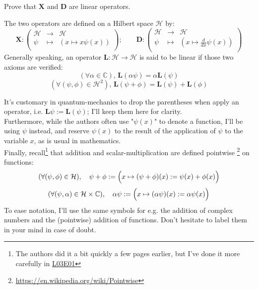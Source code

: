 \documentclass[solutions.tex]{subfiles}
\begin{document}
\maketitle
\begin{exercise} Prove that $\bm{X}$ and $\bm{D}$ are linear
operators.
\end{exercise}
The two operators are defined on a Hilbert space $\mathcal{H}$ by:
\[
	\bm{X} : \begin{pmatrix}
		\mathcal{H} &\rightarrow& \mathcal{H} \\
		\psi & \mapsto &(x \mapsto x\psi(x)) \\
	\end{pmatrix};\qquad
	\bm{D} : \begin{pmatrix}
		\mathcal{H} &\rightarrow& \mathcal{H} \\
		\psi & \mapsto & (x \mapsto \frac{d}{dx}\psi(x)) \\
	\end{pmatrix}
\]
Generally speaking, an operator $\bm{L} : \mathcal{H} \rightarrow \mathcal{H}$
is said to be linear if those two axioms are verified:
\[
	(\forall \alpha\in\mathbb{C}),\, \bm{L}(\alpha\psi) = \alpha\bm{L}(\psi)
\]
\[
	(\forall (\psi,\phi)\in\mathcal{H}^2),\, \bm{L}(\psi+\phi) = \bm{L}(\psi)+\bm{L}(\phi)
\]

\begin{remark} It's customary in quantum-mechanics to drop the parentheses when
apply an operator, i.e. $\bm{L}\psi := \bm{L}(\psi)$; I'll keep them here
for clarity. \\

Furthermore, while the authors often use "$\psi(x)$" to denote a function, I'll
be using $\psi$ instead, and reserve $\psi(x)$ to the result of the application of
$\psi$ to the variable $x$, as is usual in mathematics. \\

Finally, recall\footnote{The authors did it a bit quickly a few pages earlier,
but I've done it more carefully in
\href{https://github.com/mbivert/ttm/blob/master/qm/L03E01.pdf}{L03E01}} that
addition and scalar-multiplication are defined pointwise%
\footnote{\url{https://en.wikipedia.org/wiki/Pointwise}} on functions:
\[
	(\forall (\psi,\phi)\in\mathcal{H}),\quad
		\psi+\phi := \Bigl(x \mapsto (\psi+\phi)(x) := \psi(x)+\phi(x)\Bigr)
\]
\[
	(\forall (\psi,\alpha)\in\mathcal{H}\times\mathbb{C}),\quad
		\alpha\psi := \Bigl(x \mapsto (\alpha\psi)(x) := \alpha\psi(x)\Bigr)
\]
To ease notation, I'll use the same symbols for e.g. the addition of complex
numbers and the (pointwise) addition of functions. Don't hesitate to label
them in your mind in case of doubt.
\end{remark}
\end{document}
